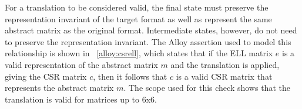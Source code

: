 \documentclass[sigconf]{acmart}
\begin{document}
For a translation to be considered valid, the final state must preserve the representation invariant of the target format as well as represent the same abstract matrix as the original format.  Intermediate states, however, do not need to preserve the representation invariant.  The Alloy assertion used to model this relationship is shown in \figurename~\ref{alloy:csrell}, which states that if the ELL matrix $e$ is a valid representation of the abstract matrix $m$ and the translation is applied, giving the CSR matrix $c$, then it follows that $c$ is a valid CSR matrix that represents the abstract matrix $m$.  The scope used for this check shows that the translation is valid for matrices up to 6x6.



\end{document}
